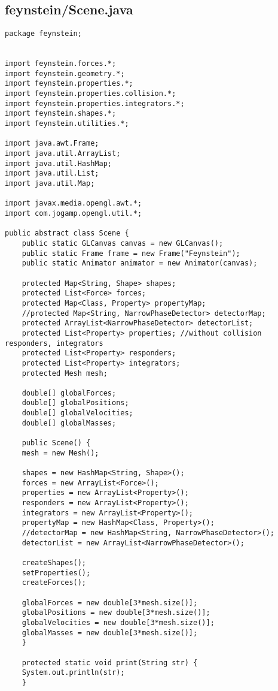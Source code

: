\subsection*{feynstein/Scene.java}
\begin{lstlisting}
package feynstein;


import feynstein.forces.*;
import feynstein.geometry.*;
import feynstein.properties.*;
import feynstein.properties.collision.*;
import feynstein.properties.integrators.*;
import feynstein.shapes.*;
import feynstein.utilities.*;

import java.awt.Frame;
import java.util.ArrayList;
import java.util.HashMap;
import java.util.List;
import java.util.Map;

import javax.media.opengl.awt.*;
import com.jogamp.opengl.util.*;

public abstract class Scene {
    public static GLCanvas canvas = new GLCanvas();
    public static Frame frame = new Frame("Feynstein");
    public static Animator animator = new Animator(canvas);

    protected Map<String, Shape> shapes;
    protected List<Force> forces;
    protected Map<Class, Property> propertyMap;
    //protected Map<String, NarrowPhaseDetector> detectorMap;
    protected ArrayList<NarrowPhaseDetector> detectorList;
    protected List<Property> properties; //without collision responders, integrators
    protected List<Property> responders;
    protected List<Property> integrators;
    protected Mesh mesh;
	
    double[] globalForces;
    double[] globalPositions;
    double[] globalVelocities;
    double[] globalMasses;

    public Scene() {
	mesh = new Mesh();

	shapes = new HashMap<String, Shape>();
	forces = new ArrayList<Force>();
	properties = new ArrayList<Property>();
	responders = new ArrayList<Property>();
	integrators = new ArrayList<Property>();
	propertyMap = new HashMap<Class, Property>();
	//detectorMap = new HashMap<String, NarrowPhaseDetector>();
	detectorList = new ArrayList<NarrowPhaseDetector>();

	createShapes();
	setProperties();
	createForces();
		
	globalForces = new double[3*mesh.size()];
	globalPositions = new double[3*mesh.size()];
	globalVelocities = new double[3*mesh.size()];
	globalMasses = new double[3*mesh.size()];
    }

    protected static void print(String str) {
	System.out.println(str);
    }


\end{lstlisting}
